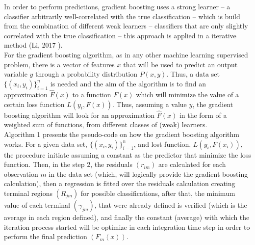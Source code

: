 \documentclass[letterpaper, 10 pt, conference]{ieeeconf}  %
\begin{document}
In order to perform predictions, gradient boosting uses a strong learner -- a classifier arbitrarily well-correlated with the true classification -- which is build from the combination of different weak learners -- classifiers that are only slightly correlated with the true classification -- this approach is applied in a iterative method (Li, 2017 \cite{Li__2017}).\\

For the gradient boosting algorithm, as in any other machine learning supervised problem, there is a vector of features $x$ that will be used to predict an output variable $y$ through a probability distribution $P(x,y)$. Thus, a data set  $\{(x_i,y_i)\}_{i=1}^n$ is needed and the aim of the algorithm is to find an approximation $\hat{F}(x)$ to a function $F(x)$ which will minimize the value of a certain loss function $L(y_i,F(x))$. Thus, assuming a value $y$, the gradient boosting algorithm will look for an approximation $\hat{F}(x)$ in the form of a weighted sum of functions, from different classes of (weak) learners.\\

Algorithm 1 presents the pseudo-code on how the gradient boosting algorithm works. For a given data set, $\{(x_i,y_i)\}_{i=1}^n$, and lost function, $L(y_i,F(x_i))$, the procedure initiate assuming a constant as the predictor that minimize the loss function. Then, in the step 2, the residuals $(r_{im})$ are calculated for each observation $m$ in the data set (which, will logically provide the gradient boosting calculation), then a regression is fitted over the residuals calculation creating terminal regions $(R_{jm})$ for possible classifications, after that, the minimum value of each terminal $(\gamma_{jm})$, that were already defined is verified (which is the average in each region defined), and finally the constant (average) with which the iteration process started will be optimize in each integration time step in order to perform the final prediction $(F_m(x))$.
\end{document}
